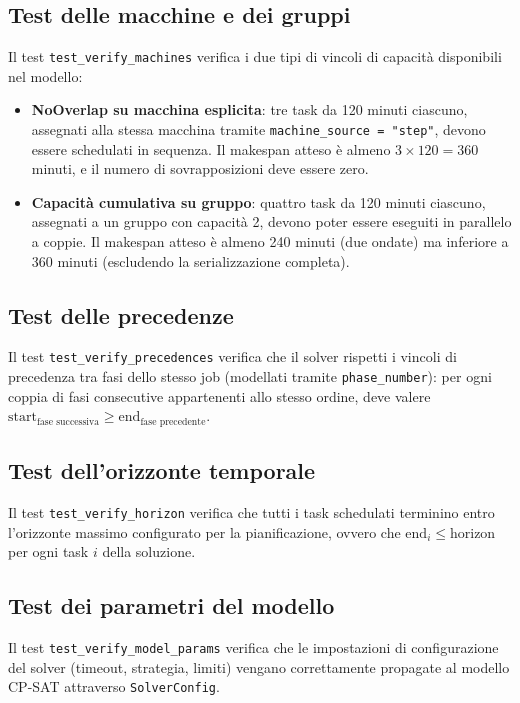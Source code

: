 \subsection{Test delle macchine e dei gruppi}

Il test \texttt{test\_verify\_machines} verifica i due tipi di vincoli di capacità disponibili nel modello:

\begin{itemize}
    \item \textbf{NoOverlap su macchina esplicita}: tre task da 120 minuti ciascuno, assegnati alla stessa macchina tramite \texttt{machine\_source = "step"}, devono essere schedulati in sequenza. Il makespan atteso è almeno $3 \times 120 = 360$ minuti, e il numero di sovrapposizioni deve essere zero.
    \item \textbf{Capacità cumulativa su gruppo}: quattro task da 120 minuti ciascuno, assegnati a un gruppo con capacità 2, devono poter essere eseguiti in parallelo a coppie. Il makespan atteso è almeno 240 minuti (due ondate) ma inferiore a 360 minuti (escludendo la serializzazione completa).
\end{itemize}

\subsection{Test delle precedenze}

Il test \texttt{test\_verify\_precedences} verifica che il solver rispetti i vincoli di precedenza tra fasi dello stesso job (modellati tramite \texttt{phase\_number}): per ogni coppia di fasi consecutive appartenenti allo stesso ordine, deve valere $\text{start}_{\text{fase successiva}} \geq \text{end}_{\text{fase precedente}}$.

\subsection{Test dell'orizzonte temporale}

Il test \texttt{test\_verify\_horizon} verifica che tutti i task schedulati terminino entro l'orizzonte massimo configurato per la pianificazione, ovvero che $\text{end}_i \leq \text{horizon}$ per ogni task $i$ della soluzione.

\subsection{Test dei parametri del modello}

Il test \texttt{test\_verify\_model\_params} verifica che le impostazioni di configurazione del solver (timeout, strategia, limiti) vengano correttamente propagate al modello CP-SAT attraverso \texttt{SolverConfig}.

